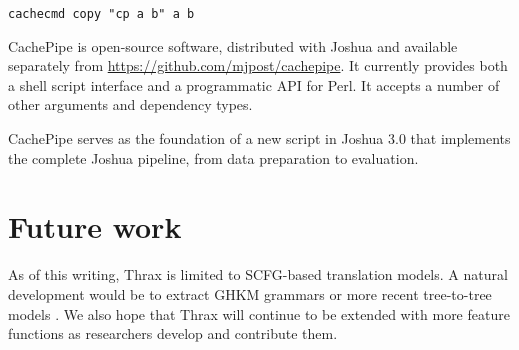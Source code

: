 \documentclass[11pt]{article}
\begin{document}
\verb|cachecmd copy "cp a b" a b|

\noindent CachePipe is open-source software, distributed with Joshua
and available separately from
\url{https://github.com/mjpost/cachepipe}.  It currently provides both
a shell script interface and a programmatic API for Perl.  It accepts
a number of other arguments and dependency types.

CachePipe serves as the foundation of a new script in Joshua 3.0 that
implements the complete Joshua pipeline, from data preparation to
evaluation.

\section{Future work}

As of this writing, Thrax is limited to SCFG-based translation models.
A natural development would be to extract GHKM grammars
\cite{galley2004whats} or more recent tree-to-tree models
\cite{zhang2008,liu2009,chiang2010}.  We also hope that Thrax will
continue to be extended with more feature functions as researchers
develop and contribute them.




\end{document}
